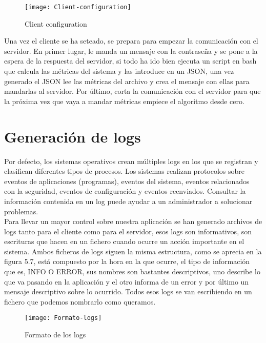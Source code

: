 \documentclass[ spanish, a4paper, 12pt, oneside]{report}
\begin{document}
\begin{figure}[!h]
   \centering
   \texttt{[image: Client-configuration]}\\
      \caption{\label{fig: Client configuration} Client configuration}
\end{figure}

Una vez el cliente se ha seteado, se prepara para empezar la comunicación con el servidor. En primer lugar, le manda un mensaje con la contraseña y se pone a la espera de la respuesta del servidor, si todo ha ido bien 
ejecuta un script en bash que calcula las métricas del sistema y las introduce en un JSON, una vez generado el JSON lee las métricas del archivo y crea el mensaje con ellas para mandarlas al servidor. Por último, corta la comunicación 
con el servidor para que la próxima vez que vaya a mandar métricas empiece el algoritmo desde cero. \\

\section{Generación de logs}
Por defecto, los sistemas operativos crean múltiples logs en los que se registran y clasifican diferentes tipos de procesos. Los sistemas realizan protocolos sobre eventos de aplicaciones (programas), eventos del sistema, eventos relacionados 
con la seguridad, eventos de configuración y eventos reenviados. Consultar la información contenida en un log puede ayudar a un administrador a solucionar problemas.\\

Para llevar un mayor control sobre nuestra aplicación se han generado archivos de logs tanto para el cliente como para el servidor, esos logs son informativos, son escrituras que hacen en un fichero cuando ocurre un acción importante en el sistema. 
Ambos ficheros de logs siguen la misma estructura, como se aprecia en la figura 5.7, está compuesto por la hora en la que ocurre, el tipo de información que es, INFO O ERROR, sus nombres son bastantes descriptivos, uno describe lo que va pasando en la aplicación 
y el otro informa de un error y por último un mensaje descriptivo sobre lo ocurrido. Todos esos logs se van escribiendo en un fichero que podemos nombrarlo como queramos. \\

\begin{figure}[!h]
   \centering
   \texttt{[image: Formato-logs]}\\
      \caption{\label{fig: Formato de los logs} Formato de los logs}
\end{figure}
\end{document}

